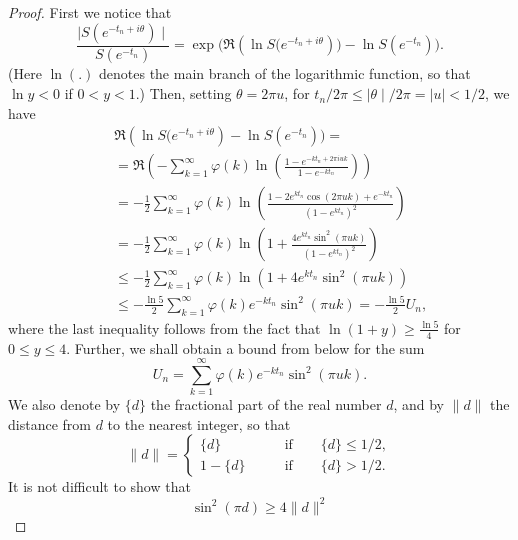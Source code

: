 \documentclass{article}
\begin{document}
\begin{proof}
 First we notice that
 \begin{equation} \label{ratio}
 \frac{\mid
S(e^{-t_n+i\theta})\mid}{S(e^{-t_n})}
=\exp{(\Re{(\ln{S(e^{-t_n+i\theta}}))}-\ln{S(e^{-t_n}))}}.
\end{equation}
 (Here $\ln{(.)}$ denotes the main branch of the
logarithmic function, so that $\ln{y}<0$ if $0<y<1$.) Then,
setting $\theta=2\pi u$, for $t_n/2\pi\le\mid\theta\mid/2\pi=\mid
u\mid<1/2$, we have
\begin{eqnarray}\label{long}
& & \Re{(\ln{S(e^{-t_n+i\theta}})}-\ln{S(e^{-t_n}))} = \nonumber
\\
& & =\Re{\left(-\sum_{k=1}^\infty\varphi(k)
\ln{\left(\frac{1-e^{-kt_n+2\pi i uk}}{1-e^{-k
t_n}}\right)}\right)} \nonumber \\
& & =-\frac{1}{2}\sum_{k=1}^\infty\varphi(k)
\ln{\left(\frac{1-2e^{kt_n}\cos{(2\pi uk)}+e^{-kt_n}}
{(1-e^{kt_n})^2}\right)} \nonumber \\
& & =-\frac{1}{2}\sum_{k=1}^\infty\varphi(k) \ln{\left(1+
\frac{4e^{kt_n}\sin^2{(\pi uk)}}{(1-e^{kt_n})^2}\right)}
\nonumber \\
& & \le -\frac{1}{2}\sum_{k=1}^\infty\varphi(k)
\ln{(1+4e^{kt_n}\sin^2{(\pi uk)})} \nonumber \\
& & \le -\frac{\ln{5}}{2}\sum_{k=1}^\infty\varphi(k) e^{-kt_n}
\sin^2{(\pi uk)} =-\frac{\ln{5}}{2} U_n,
\end{eqnarray}
where the last inequality follows from the fact that
$\ln{(1+y)}\ge\frac{\ln{5}}{4}$ for $0\le y\le 4$. Further, we
shall obtain a bound from below for the sum
\begin{equation}\label{un}
U_n=\sum_{k=1}^\infty\varphi(k) e^{-kt_n} \sin^2{(\pi uk)}.
\end{equation}
We also denote by $\{d\}$ the fractional part of the
 real number $d$, and by $\parallel d\parallel$ the
 distance from $d$ to the nearest integer, so that
 $$
 \parallel d\parallel=\left\{\begin{array}{ll} \{d\} & \qquad  \mbox {if}\qquad \{d\}\le 1/2, \\
 1-\{d\} & \qquad \mbox {if}\qquad \{d\}>1/2.
 \end{array}\right.
 $$
 It is not difficult to show that
 \begin{equation} \label{sinlowbound}
 \sin^2{(\pi d)}\ge 4\parallel d\parallel^2
 \end{equation}



\end{proof}
\end{document}
